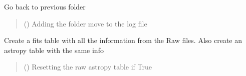 \documentclass[letterpaper,10pt,english]{sphinxmanual}
\begin{document}
\begin{fulllineitems}
\begin{fulllineitems}
\label{\detokenize{api/pymusepipe:pymusepipe.musepipe.MusePipe.goto_prevfolder}}
\pysigstartsignatures
{}
\pysigstopsignatures
\sphinxAtStartPar
Go back to previous folder
\begin{quote}\begin{description}
\sphinxAtStartPar
{} (\sphinxstyleliteralemphasis{\sphinxupquote{ {[}}}\sphinxstyleliteralemphasis{\sphinxupquote{{]}}}) \textendash{} Adding the folder move to the log file

\end{description}\end{quote}

\end{fulllineitems}


\begin{fulllineitems}
\label{\detokenize{api/pymusepipe:pymusepipe.musepipe.MusePipe.init_raw_table}}
\pysigstartsignatures
{}
\pysigstopsignatures
\sphinxAtStartPar
Create a fits table with all the information from
the Raw files. Also create an astropy table with the same info
\begin{quote}\begin{description}
\sphinxAtStartPar
{} (\sphinxstyleliteralemphasis{\sphinxupquote{ {[}}}\sphinxstyleliteralemphasis{\sphinxupquote{{]}}}) \textendash{} Resetting the raw astropy table if True

\end{description}\end{quote}


\end{fulllineitems}
\end{fulllineitems}
\end{document}
